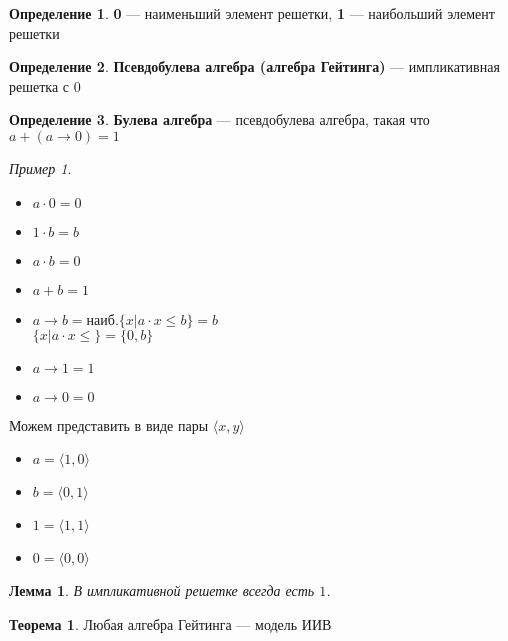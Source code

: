 \documentclass[oneside]{book}
\theoremstyle{plain}
\newtheorem{lemma}{Лемма}
\theoremstyle{remark}
\newtheorem*{examp}{Пример}
\theoremstyle{definition}
\newtheorem{theorem}{Теорема}[section]
\newtheorem*{definition}{Определение}
\begin{document}
\begin{definition}
\textbf{0} --- наименьший элемент решетки, \textbf{1} --- наибольший элемент решетки
\end{definition}
\begin{definition}
\textbf{Псевдобулева алгебра (алгебра Гейтинга)} --- импликативная решетка с \(0\)
\label{org9737aa9}
\end{definition}
\begin{definition}
\textbf{Булева алгебра} --- псевдобулева алгебра, такая что \(a + (a \to 0) = 1\)
\label{org5fd968f}
\end{definition}
\begin{examp}
\-
\begin{center}
\end{center}
\begin{itemize}
\item \(a \cdot 0 = 0\)
\item \(1\cdot b = b\)
\item \(a \cdot b = 0\)
\item \(a + b = 1\)
\item \(a \to b = \text{наиб.}\{x \big| a\cdot x \le b\} = b\) \\
\(\{x \big| a \cdot x \le \} = \{0, b\}\)
\item \(a \to 1 = 1\)
\item \(a \to 0 = 0\)
\end{itemize}
Можем представить в виде пары \(\langle x, y \rangle\)
\begin{itemize}
\item \(a = \langle 1, 0 \rangle\)
\item \(b = \langle 0 , 1\rangle\)
\item \(1 = \langle 1, 1 \rangle\)
\item \(0 = \langle 0, 0 \rangle\)
\end{itemize}
\end{examp}
\begin{lemma}
В импликативной решетке всегда есть \(1\).
\end{lemma}
\begin{theorem}
Любая алгебра Гейтинга --- модель ИИВ
\end{theorem}
\end{document}
